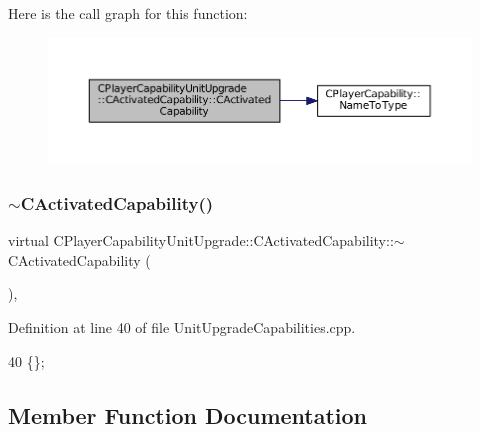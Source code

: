 Here is the call graph for this function\+:\nopagebreak
\begin{figure}[H]
\begin{center}
\leavevmode
\includegraphics[width=350pt]{classCPlayerCapabilityUnitUpgrade_1_1CActivatedCapability_a567ef5f24fbf77a0be2d7340cd980c4a_cgraph}
\end{center}
\end{figure}
\hypertarget{classCPlayerCapabilityUnitUpgrade_1_1CActivatedCapability_a4402be13dd341fdc5a2612732c6d2b39}{}\label{classCPlayerCapabilityUnitUpgrade_1_1CActivatedCapability_a4402be13dd341fdc5a2612732c6d2b39} 
\subsubsection{\texorpdfstring{$\sim$\+C\+Activated\+Capability()}{~CActivatedCapability()}}
{\footnotesize\ttfamily virtual C\+Player\+Capability\+Unit\+Upgrade\+::\+C\+Activated\+Capability\+::$\sim$\+C\+Activated\+Capability (\begin{DoxyParamCaption}{ }\end{DoxyParamCaption})\hspace{0.3cm}{\ttfamily [inline]}, {\ttfamily [virtual]}}



Definition at line 40 of file Unit\+Upgrade\+Capabilities.\+cpp.


\begin{DoxyCode}
40 \{\};
\end{DoxyCode}


\subsection{Member Function Documentation}
\hypertarget{classCPlayerCapabilityUnitUpgrade_1_1CActivatedCapability_a29b41666081cf420e9f3b7d93c09920b}{}\label{classCPlayerCapabilityUnitUpgrade_1_1CActivatedCapability_a29b41666081cf420e9f3b7d93c09920b} 

